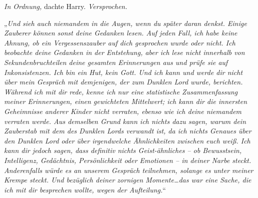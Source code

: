 \emph{In Ordnung,} dachte Harry. \emph{Versprochen.}

„\emph{Und sieh auch niemandem in die Augen, wenn du später daran denkst. Einige Zauberer können sonst deine Gedanken lesen. Auf jeden Fall, ich habe keine Ahnung, ob ein Vergessenszauber auf dich gesprochen wurde oder nicht. Ich beobachte deine Gedanken in der Entstehung, aber ich lese nicht innerhalb von Sekundenbruchteilen deine gesamten Erinnerungen aus und prüfe sie auf Inkonsistenzen. Ich bin ein Hut, kein Gott. Und ich kann und werde dir nicht über mein Gespräch mit demjenigen, der zum Dunklen Lord wurde, berichten. Während ich mit dir rede, \emph{kenne} ich nur eine statistische Zusammenfassung meiner Erinnerungen, einen gewichteten Mittelwert; ich \emph{kann} dir die innersten Geheimnisse anderer Kinder nicht verraten, ebenso wie ich deine niemandem verraten werde. Aus demselben Grund kann ich nichts dazu sagen, warum dein Zauberstab mit dem des Dunklen Lords verwandt ist, da ich nichts Genaues über den Dunklen Lord oder über irgendwelche Ähnlichkeiten zwischen euch weiß. Ich \emph{kann} dir jedoch sagen, dass definitiv nichts Geist-ähnliches – ob Bewusstsein, Intelligenz, Gedächtnis, Persönlichkeit oder Emotionen – in deiner Narbe steckt. Anderenfalls würde es an unserem Gespräch teilnehmen, solange es unter meiner Krempe steckt. Und bezüglich deiner zornigen Momente…das war eine Sache, die ich mit dir besprechen wollte, wegen der Aufteilung.}“

